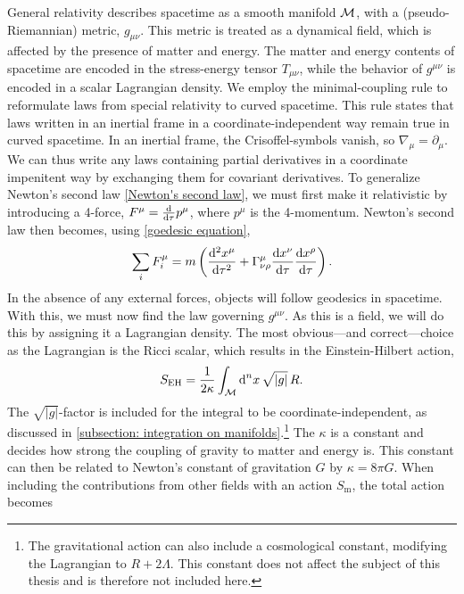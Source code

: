 General relativity describes spacetime as a smooth manifold $\mathcal{M}$, with a (pseudo-Riemannian) metric, $g_{\mu \nu}$.
This metric is treated as a dynamical field, which is affected by the presence of matter and energy.
The matter and energy contents of spacetime are encoded in the stress-energy tensor $T_{\mu \nu}$, while the behavior of $g^{\mu \nu}$ is encoded in a scalar Lagrangian density.
We employ the minimal-coupling rule to reformulate laws from special relativity to curved spacetime.
This rule states that laws written in an inertial frame in a coordinate-independent way remain true in curved spacetime.
In an inertial frame, the Crisoffel-symbols vanish, so $\nabla_\mu = \partial_\mu$.
We can thus write any laws containing partial derivatives in a coordinate impenitent way by exchanging them for covariant derivatives.
To generalize Newton's second law \autoref{Newton's second law}, we must first make it relativistic by introducing a 4-force, $F^\mu = \odv{}{\tau} p^\mu $, where $p^\mu$ is the 4-momentum.
Newton's second law then becomes, using \autoref{goedesic equation},~\autocite{hartleGravityIntroductionEinstein2021}
%
\begin{equation}
    \label{covariant version of second law}
    \sum_i F_i^\mu 
    = m \left(
        \odv[2]{x^\mu}{\tau} + \Gamma^\mu_{\nu \rho} \odv{x^\nu}{\tau} \odv{x^\rho}{\tau}
    \right).
\end{equation}
%
In the absence of any external forces, objects will follow geodesics in spacetime.
With this, we must now find the law governing $g^{\mu\nu}$.
As this is a field, we will do this by assigning it a Lagrangian density.
The most obvious---and correct---choice as the Lagrangian is the Ricci scalar, which results in the Einstein-Hilbert action,
%
\begin{equation}
    \label{Einstein-Hilbert action}
    S_{\text{EH}} = \frac{1}{2\kappa}\int_{\mathcal{M}} \text{d}^n x \, \sqrt{|g|}\, R.
\end{equation}
%
The $\sqrt{|g|}$-factor is included for the integral to be coordinate-independent, as discussed in  \autoref{subsection: integration on manifolds}.\footnote{The gravitational action can also include a cosmological constant, modifying the Lagrangian to $R + 2 \Lambda$. This constant does not affect the subject of this thesis and is therefore not included here.}
The $\kappa$ is a constant and decides how strong the coupling of gravity to matter and energy is.
This constant can then be related to Newton's constant of gravitation $G$ by $\kappa = 8 \pi G$.
When including the contributions from other fields with an action $S_\text{m}$, the total action becomes 
